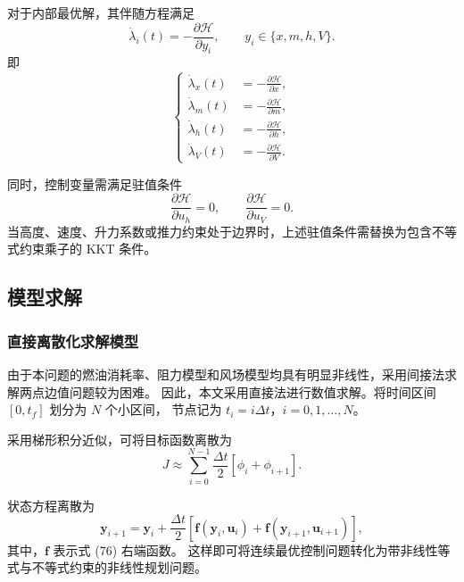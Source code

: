 \documentclass[UTF8]{ctexart}
\begin{document}
对于内部最优解，其伴随方程满足
\begin{equation}
    \dot{\lambda}_i(t)
    =
    -\frac{\partial \mathcal H}{\partial y_i},
    \qquad
    y_i\in\{x,m,h,V\}.
    \label{eq:q3_adjoint}
\end{equation}
即
\begin{equation}
\left\{
\begin{aligned}
    \dot\lambda_x(t)&=-\frac{\partial \mathcal H}{\partial x},\\
    \dot\lambda_m(t)&=-\frac{\partial \mathcal H}{\partial m},\\
    \dot\lambda_h(t)&=-\frac{\partial \mathcal H}{\partial h},\\
    \dot\lambda_V(t)&=-\frac{\partial \mathcal H}{\partial V}.
\end{aligned}
\right.
\label{eq:q3_adjoint_system}
\end{equation}

同时，控制变量需满足驻值条件
\begin{equation}
    \frac{\partial \mathcal H}{\partial u_h}=0,
    \qquad
    \frac{\partial \mathcal H}{\partial u_V}=0.
    \label{eq:q3_stationary}
\end{equation}
当高度、速度、升力系数或推力约束处于边界时，上述驻值条件需替换为包含不等式约束乘子的
KKT 条件。
\subsection{模型求解}
\subsubsection{直接离散化求解模型}

由于本问题的燃油消耗率、阻力模型和风场模型均具有明显非线性，采用间接法求解两点边值问题较为困难。
因此，本文采用直接法进行数值求解。将时间区间 $[0,t_f]$ 划分为 $N$ 个小区间，
节点记为 $t_i=i\Delta t$，$i=0,1,\ldots,N$。

采用梯形积分近似，可将目标函数离散为
\begin{equation}
    J
    \approx
    \sum_{i=0}^{N-1}
    \frac{\Delta t}{2}
    \left[
    \phi_i+\phi_{i+1}
    \right].
    \label{eq:q3_discrete_objective}
\end{equation}
  
状态方程离散为
\begin{equation}
    \boldsymbol y_{i+1}
    =
    \boldsymbol y_i
    +
    \frac{\Delta t}{2}
    \left[
    \boldsymbol f(\boldsymbol y_i,\boldsymbol u_i)
    +
    \boldsymbol f(\boldsymbol y_{i+1},\boldsymbol u_{i+1})
    \right],
    \label{eq:q3_trapezoid}
\end{equation}
其中，$\boldsymbol f$ 表示式 (76) 右端函数。
这样即可将连续最优控制问题转化为带非线性等式与不等式约束的非线性规划问题。
\end{document}
